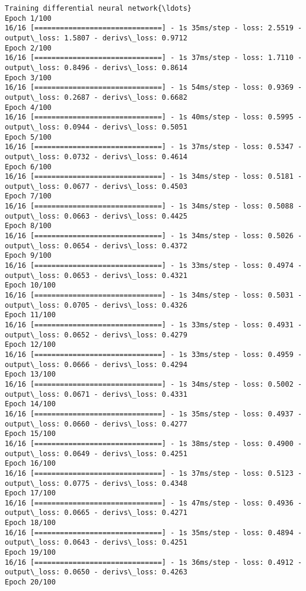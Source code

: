 \documentclass[11pt]{article}
\begin{document}
    \begin{Verbatim}[commandchars=\\\{\}]
Training differential neural network{\ldots}
Epoch 1/100
16/16 [==============================] - 1s 35ms/step - loss: 2.5519 -
output\_loss: 1.5807 - derivs\_loss: 0.9712
Epoch 2/100
16/16 [==============================] - 1s 37ms/step - loss: 1.7110 -
output\_loss: 0.8496 - derivs\_loss: 0.8614
Epoch 3/100
16/16 [==============================] - 1s 54ms/step - loss: 0.9369 -
output\_loss: 0.2687 - derivs\_loss: 0.6682
Epoch 4/100
16/16 [==============================] - 1s 40ms/step - loss: 0.5995 -
output\_loss: 0.0944 - derivs\_loss: 0.5051
Epoch 5/100
16/16 [==============================] - 1s 37ms/step - loss: 0.5347 -
output\_loss: 0.0732 - derivs\_loss: 0.4614
Epoch 6/100
16/16 [==============================] - 1s 34ms/step - loss: 0.5181 -
output\_loss: 0.0677 - derivs\_loss: 0.4503
Epoch 7/100
16/16 [==============================] - 1s 34ms/step - loss: 0.5088 -
output\_loss: 0.0663 - derivs\_loss: 0.4425
Epoch 8/100
16/16 [==============================] - 1s 34ms/step - loss: 0.5026 -
output\_loss: 0.0654 - derivs\_loss: 0.4372
Epoch 9/100
16/16 [==============================] - 1s 33ms/step - loss: 0.4974 -
output\_loss: 0.0653 - derivs\_loss: 0.4321
Epoch 10/100
16/16 [==============================] - 1s 34ms/step - loss: 0.5031 -
output\_loss: 0.0705 - derivs\_loss: 0.4326
Epoch 11/100
16/16 [==============================] - 1s 33ms/step - loss: 0.4931 -
output\_loss: 0.0652 - derivs\_loss: 0.4279
Epoch 12/100
16/16 [==============================] - 1s 33ms/step - loss: 0.4959 -
output\_loss: 0.0666 - derivs\_loss: 0.4294
Epoch 13/100
16/16 [==============================] - 1s 34ms/step - loss: 0.5002 -
output\_loss: 0.0671 - derivs\_loss: 0.4331
Epoch 14/100
16/16 [==============================] - 1s 35ms/step - loss: 0.4937 -
output\_loss: 0.0660 - derivs\_loss: 0.4277
Epoch 15/100
16/16 [==============================] - 1s 38ms/step - loss: 0.4900 -
output\_loss: 0.0649 - derivs\_loss: 0.4251
Epoch 16/100
16/16 [==============================] - 1s 37ms/step - loss: 0.5123 -
output\_loss: 0.0775 - derivs\_loss: 0.4348
Epoch 17/100
16/16 [==============================] - 1s 47ms/step - loss: 0.4936 -
output\_loss: 0.0665 - derivs\_loss: 0.4271
Epoch 18/100
16/16 [==============================] - 1s 35ms/step - loss: 0.4894 -
output\_loss: 0.0643 - derivs\_loss: 0.4251
Epoch 19/100
16/16 [==============================] - 1s 36ms/step - loss: 0.4912 -
output\_loss: 0.0650 - derivs\_loss: 0.4263
Epoch 20/100

\end{Verbatim}
\end{document}

